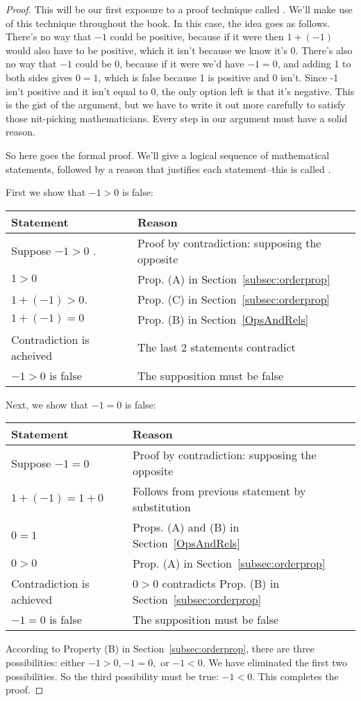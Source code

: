 \begin{proof}
This will be our first exposure to a proof technique called . We'll make use of this technique throughout the book. In this case, the idea goes as follows.  There's no way that $-1$ could be positive, because if it were then $1 + (-1)$ would also have to be positive, which it isn't because we know it's 0.  There's also no way that $-1$ could be 0, because if it were we'd have $-1=0$, and adding 1 to both sides gives $0 = 1$, which is false because 1 is positive and 0 isn't.  Since -1 isn't positive and it isn't equal to 0, the only option left is that it's negative. This is the gist of the argument, but we have to write it out more carefully to satisfy those nit-picking mathematicians. Every step in our argument must have a solid reason. 

So here goes the formal proof. We'll give a logical sequence of mathematical statements, followed by a reason that justifies each statement--this is called .

\noindent
First we show that $-1 > 0$ is false:

\begin{tabular}{l| l}
Statement& Reason\\
\hline
Suppose $-1>0$ . & Proof by contradiction: supposing the opposite\\
$1>0$ &  Prop. (A) in Section~\ref{subsec:orderprop}\\
$1 + (-1)> 0$. & Prop. (C) in  Section~\ref{subsec:orderprop}\\
$1 + (-1) = 0$ & Prop. (B) in Section~\ref{OpsAndRels}\\
Contradiction is acheived&  The last 2 statements contradict\\
$-1>0 $ is false& The supposition must be false
\end{tabular}

\noindent
Next, we show that $-1=0$ is false:

\begin{tabular}{l| l}
Statement& Reason\\
\hline
Suppose $-1=0$ & Proof by contradiction: supposing the opposite\\
$1 + (-1) = 1 + 0$ & Follows from previous statement by substitution\\
$0=1$   & Props. (A) and (B) in Section~\ref{OpsAndRels}\\
$0>0$  & Prop. (A)  in  Section~\ref{subsec:orderprop}\\
Contradiction is achieved & $0>0$ contradicts Prop. (B)  in  Section~\ref{subsec:orderprop}\\
$-1 = 0$ is false &The supposition must be false
\end{tabular}

\noindent
According to   Property (B) in  Section~\ref{subsec:orderprop}, there are three  possibilities: either $-1>0, -1=0,$ or $-1<0$.  We have eliminated the first two possibilities.  So the third possibility must be true:  $-1<0$. This completes the proof.

\end{proof} 
